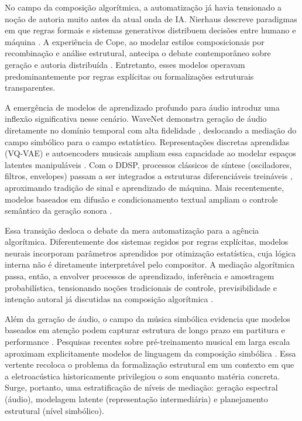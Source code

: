 No campo da composição algorítmica, a automatização já havia tensionado a noção de autoria muito antes da atual onda de IA. Nierhaus descreve paradigmas em que regras formais e sistemas generativos distribuem decisões entre humano e máquina \cite{nierhaus2009algorithmiccomposition}. A experiência de Cope, ao modelar estilos composicionais por recombinação e análise estrutural, antecipa o debate contemporâneo sobre geração e autoria distribuída \cite{cope1996emi}. Entretanto, esses modelos operavam predominantemente por regras explícitas ou formalizações estruturais transparentes.

A emergência de modelos de aprendizado profundo para áudio introduz uma inflexão significativa nesse cenário. WaveNet demonstra geração de áudio diretamente no domínio temporal com alta fidelidade \cite{oord2016wavenet}, deslocando a mediação do campo simbólico para o campo estatístico. Representações discretas aprendidas (VQ-VAE) e autoencoders musicais ampliam essa capacidade ao modelar espaços latentes manipuláveis \cite{oord2017vqvae,engel2017nsynth}. Com o DDSP, processos clássicos de síntese (osciladores, filtros, envelopes) passam a ser integrados a estruturas diferenciáveis treináveis \cite{engel2020ddsp}, aproximando tradição de sinal e aprendizado de máquina. Mais recentemente, modelos baseados em difusão e condicionamento textual ampliam o controle semântico da geração sonora \cite{liu2023audioldm2,copet2023musicgen}.

Essa transição desloca o debate da mera automatização para a agência algorítmica. Diferentemente dos sistemas regidos por regras explícitas, modelos neurais incorporam parâmetros aprendidos por otimização estatística, cuja lógica interna não é diretamente interpretável pelo compositor. A mediação algorítmica passa, então, a envolver processos de aprendizado, inferência e amostragem probabilística, tensionando noções tradicionais de controle, previsibilidade e intenção autoral já discutidas na composição algorítmica \cite{nierhaus2009algorithmiccomposition}.

Além da geração de áudio, o campo da música simbólica evidencia que modelos baseados em atenção podem capturar estrutura de longo prazo em partitura e performance \cite{huang2018musictransformer}. Pesquisas recentes sobre pré-treinamento musical em larga escala aproximam explicitamente modelos de linguagem da composição simbólica \cite{qu2024mupt}. Essa vertente recoloca o problema da formalização estrutural em um contexto em que a eletroacústica historicamente privilegiou o som enquanto matéria concreta. Surge, portanto, uma estratificação de níveis de mediação: geração espectral (áudio), modelagem latente (representação intermediária) e planejamento estrutural (nível simbólico).

